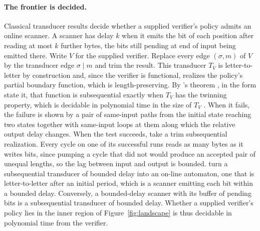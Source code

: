 \documentclass[11pt,a4paper]{article}
\theoremstyle{definition}
\theoremstyle{plain}
\begin{document}
\paragraph{The frontier is decided.} Classical transducer results decide whether a supplied verifier's policy admits an
online scanner. A scanner has delay $k$ when it emits the bit of each position after reading at most $k$ further bytes,
the bits still pending at end of input being emitted there. Write $V$ for the supplied verifier. Replace every edge
$(\sigma, m)$ of $V$ by the transducer edge $\sigma \mid m$ and trim the result. This transducer $T_V$ is
letter-to-letter by construction and, since the verifier is functional, realizes the policy's partial boundary function,
which is length-preserving. By \citeauthor{choffrut1977sequential}'s theorem \citep{choffrut1977sequential}, in the form
\citet{beal2002determinization} state it, that function is subsequential exactly when $T_V$ has the twinning property,
which is decidable in polynomial time in the size of $T_V$ \citep{weber1995economy,beal2003squaring}. When it fails, the
failure is shown by a pair of same-input paths from the initial state reaching two states together with same-input loops
at them along which the relative output delay changes. When the test succeeds, take a trim subsequential realization.
Every cycle on one of its successful runs reads as many bytes as it writes bits, since pumping a cycle that did not
would produce an accepted pair of unequal lengths, so the lag between input and output is bounded.
\citet{frougny1998synchronisation} turn a subsequential transducer of bounded delay into an on-line automaton, one that
is letter-to-letter after an initial period, which is a scanner emitting each bit within a bounded delay. Conversely, a
bounded-delay scanner with its buffer of pending bits is a subsequential transducer of bounded delay. Whether a supplied
verifier's policy lies in the inner region of Figure~\ref{fig:landscape} is thus decidable in polynomial time from the
verifier.
\end{document}
